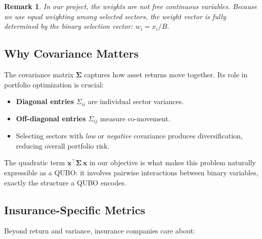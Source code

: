 \documentclass[12pt, a4paper]{article}
\newtheorem{remark}{Remark}[section]
\begin{document}
\begin{remark}
In our project, the weights are not free continuous variables. Because we use
equal weighting among selected sectors, the weight vector is fully determined
by the binary selection vector: $w_i = x_i / B$.
\end{remark}

\subsection{Why Covariance Matters}

The covariance matrix $\bm{\Sigma}$ captures how asset returns move together.
Its role in portfolio optimization is crucial:

\begin{itemize}
    \item \textbf{Diagonal entries} $\Sigma_{ii}$ are individual sector variances.
    \item \textbf{Off-diagonal entries} $\Sigma_{ij}$ measure co-movement.
    \item Selecting sectors with \textit{low} or \textit{negative} covariance produces diversification, reducing overall portfolio risk.
\end{itemize}

The quadratic term $\mathbf{x}^\top \bm{\Sigma}\, \mathbf{x}$ in our objective
is what makes this problem naturally expressible as a QUBO: it involves pairwise
interactions between binary variables, exactly the structure a QUBO encodes.

\subsection{Insurance-Specific Metrics}

Beyond return and variance, insurance companies care about:
\end{document}
